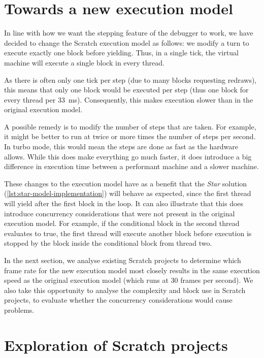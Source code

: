 \documentclass[../main]{subfiles}
\begin{document}
\section{Towards a new execution model}\label{sec:a-family-of-new-execution-models}

In line with how we want the stepping feature of the debugger to work, we have decided to change the Scratch execution model as follows: we modify a turn to execute exactly one block before yielding.
Thus, in a single tick, the virtual machine will execute a single block in every thread.

As there is often only one tick per step (due to many blocks requesting redraws), this means that only one block would be executed per step (thus one block for every thread per \qty{33}{\milli\second}).
Consequently, this makes execution slower than in the original execution model.

A possible remedy is to modify the number of steps that are taken.
For example, it might be better to run at twice or more times the number of steps per second.
In turbo mode, this would mean the steps are done as fast as the hardware allows.
While this does make everything go much faster, it does introduce a big difference in execution time between a performant machine and a slower machine.

These changes to the execution model have as a benefit that the \emph{Star} solution (\cref{lst:star-model-implementation}) will behave as expected, since the first thread will yield after the first block in the loop.
It can also illustrate that this does introduce concurrency considerations that were not present in the original execution model.
For example, if the conditional block in the second thread evaluates to true, the first thread will execute another block before execution is stopped by the block inside the conditional block from thread two.

In the next section, we analyse existing Scratch projects to determine which frame rate for the new execution model most closely results in the same execution speed as the original execution model (which runs at 30 frames per second).
We also take this opportunity to analyse the complexity and block use in Scratch projects, to evaluate whether the concurrency considerations would cause problems.

\section{Exploration of Scratch projects}\label{sec:evaluation-of-scratch-projects}
\end{document}
